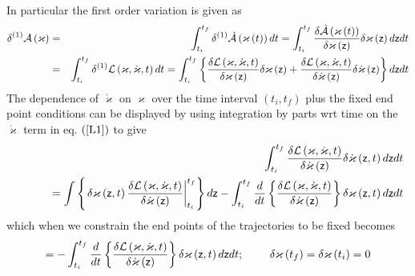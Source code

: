 In particular the first order variation is given as 
\begin{eqnarray}
\delta ^{\left( 1\right) }{\cal A}\left( \varkappa \right)
&=&\int_{t_{i}}^{t_{f}}\delta ^{\left( 1\right) }{\cal \dot{A}}\left(
\varkappa \left( t\right) \right) dt=\int_{t_{i}}^{t_{f}}\frac{\delta {\cal 
\dot{A}}\left( \varkappa \left( t\right) \right) }{\delta \varkappa \left( 
{\sf z}\right) }\delta \varkappa \left( {\sf z}\right) d{\sf z}dt  \label{A1}
\\
&=&\int_{t_{i}}^{t_{f}}\delta ^{\left( 1\right) }{\cal L}\left( \varkappa ,%
\dot{\varkappa},t\right) dt=\int_{t_{i}}^{t_{f}}\left\{ \frac{\delta {\cal L}%
\left( \varkappa ,\dot{\varkappa},t\right) }{\delta \varkappa \left( {\sf z}%
\right) }\delta \varkappa \left( {\sf z}\right) +\frac{\delta {\cal L}\left(
\varkappa ,\dot{\varkappa},t\right) }{\delta \dot{\varkappa}\left( {\sf z}%
\right) }\delta \dot{\varkappa}\left( {\sf z}\right) \right\} d{\sf z}dt
\label{L1}
\end{eqnarray}%
The dependence of $\dot{\varkappa}$ on $\varkappa $ over the time interval $%
\left( t_{i},t_{f}\right) $ plus the fixed end point conditions can be
displayed by using integration by parts wrt time on the $\dot{\varkappa}$
term in eq. $\left( \ref{L1}\right) $ to give 
\begin{eqnarray}
&&\int_{t_{i}}^{t_{f}}\frac{\delta {\cal L}\left( \varkappa ,\dot{\varkappa}%
,t\right) }{\delta \dot{\varkappa}\left( {\sf z}\right) }\delta \dot{%
\varkappa}\left( {\sf z},t\right) d{\sf z}dt  \nonumber \\
&&\left. {}\right. \qquad =\int \left\{ \left. \delta \varkappa \left( {\sf z%
},t\right) \frac{\delta {\cal L}\left( \varkappa ,\dot{\varkappa},t\right) }{%
\delta \dot{\varkappa}\left( {\sf z}\right) }\right|
_{t_{i}}^{t_{f}}\right\} d{\sf z}-\int_{t_{i}}^{t_{f}}\frac{d}{dt}\left\{ 
\frac{\delta {\cal L}\left( {\cal \varkappa },{\cal \dot{\varkappa}}%
,t\right) }{\delta {\cal \dot{\varkappa}}\left( {\sf z}\right) }\right\}
\delta \varkappa \left( {\sf z},t\right) d{\sf z}dt
\end{eqnarray}%
which when we constrain the end points of the trajectories to be fixed
becomes 
\begin{equation}
=-\int_{t_{i}}^{t_{f}}\frac{d}{dt}\left\{ \frac{\delta {\cal L}\left( {\cal %
\varkappa },{\cal \dot{\varkappa}},t\right) }{\delta {\cal \dot{\varkappa}}%
\left( {\sf z}\right) }\right\} \delta \varkappa \left( {\sf z},t\right) d%
{\sf z}dt;\qquad \text{ }\delta \varkappa \left( t_{f}\right) =\delta
\varkappa \left( t_{i}\right) =0
\end{equation}%
